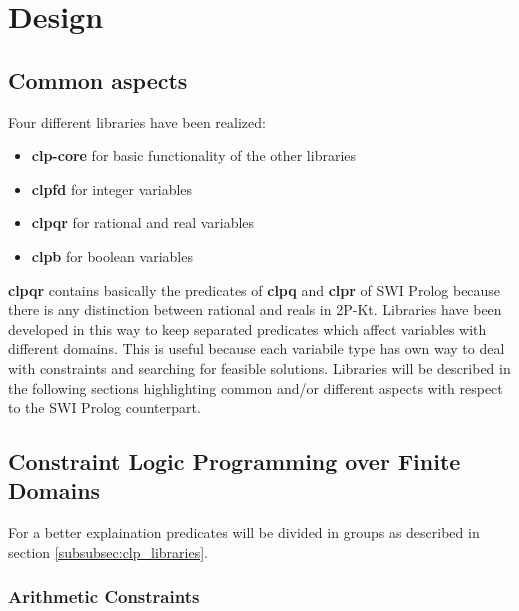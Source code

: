 \section{Design}\label{sec:design}

\subsection{Common aspects}\label{subsec:common_aspects}
Four different libraries have been realized:
\begin{itemize}
    \item \textbf{clp-core} for basic functionality of the other libraries
    \item \textbf{clpfd} for integer variables
    \item \textbf{clpqr} for rational and real variables
    \item \textbf{clpb} for boolean variables
\end{itemize}
\textbf{clpqr} contains basically the predicates of \textbf{clpq} and \textbf{clpr} of SWI Prolog because there
is any distinction between rational and reals in 2P-Kt.\newline
Libraries have been developed in this way to keep separated predicates which affect variables with different domains. This is useful because
each variabile type has own way to deal with constraints and searching for feasible solutions.
Libraries will be described in the following sections highlighting common and/or different aspects with respect to the SWI Prolog counterpart.

\subsection{Constraint Logic Programming over Finite Domains}\label{subsec:clpfd}
For a better explaination predicates will be divided in groups as described in section \ref{subsubsec:clp_libraries}.

\subsubsection{Arithmetic Constraints}\label{subsubsec:arithmetic_constraints}

